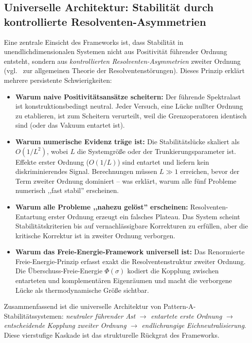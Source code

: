\documentclass[12pt,a4paper]{article}
\theoremstyle{definition}
\theoremstyle{remark}
\begin{document}
\subsection{Universelle Architektur: Stabilität durch kontrollierte Resolventen-Asymmetrien}
\label{sec:universal-architecture}

Eine zentrale Einsicht des Frameworks ist, dass Stabilität in unendlichdimensionalen Systemen nicht aus Positivität führender Ordnung entsteht, sondern aus \emph{kontrollierten Resolventen-Asymmetrien} zweiter Ordnung (vgl.~\cite{Kato1995} zur allgemeinen Theorie der Resolventenstörungen). Dieses Prinzip erklärt mehrere persistente Schwierigkeiten:

\begin{itemize}
    \item \textbf{Warum naive Positivitätsansätze scheitern:} Der führende Spektralast ist konstruktionsbedingt neutral. Jeder Versuch, eine Lücke nullter Ordnung zu etablieren, ist zum Scheitern verurteilt, weil die Grenzoperatoren identisch sind (oder das Vakuum entartet ist).

    \item \textbf{Warum numerische Evidenz träge ist:} Die Stabilitätslücke skaliert als $O(1/L^2)$, wobei $L$ die Systemgröße oder der Trunkierungsparameter ist. Effekte erster Ordnung ($O(1/L)$) sind entartet und liefern kein diskriminierendes Signal. Berechnungen müssen $L \gg 1$ erreichen, bevor der Term zweiter Ordnung dominiert -- was erklärt, warum alle fünf Probleme numerisch ,,fast stabil'' erscheinen.

    \item \textbf{Warum alle Probleme ,,nahezu gelöst'' erscheinen:} Resolventen-Entartung erster Ordnung erzeugt ein falsches Plateau. Das System scheint Stabilitätskriterien bis auf vernachlässigbare Korrekturen zu erfüllen, aber die kritische Korrektur ist in zweiter Ordnung verborgen.

    \item \textbf{Warum das Freie-Energie-Framework universell ist:} Das Renormierte Freie-Energie-Prinzip erfasst exakt die Resolventenstruktur zweiter Ordnung. Die Überschuss-Freie-Energie $\Phi(\sigma)$ kodiert die Kopplung zwischen entarteten und komplementären Eigenräumen und macht die verborgene Lücke als thermodynamische Größe sichtbar.
\end{itemize}

\noindent
Zusammenfassend ist die universelle Architektur von Pattern-A-Stabilitätssystemen: \emph{neutraler führender Ast $\to$ entartete erste Ordnung $\to$ entscheidende Kopplung zweiter Ordnung $\to$ endlichrangige Eichneutralisierung}. Diese vierstufige Kaskade ist das strukturelle Rückgrat des Frameworks.
\end{document}
